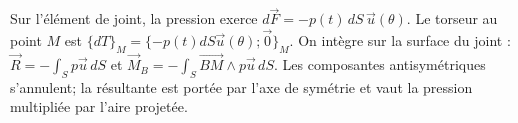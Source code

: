 \begin{corrigebox}
Sur l'élément de joint, la pression exerce
                $d\vec F=-p(t)\,dS\,\vec u(\theta)$. Le torseur au point $M$ est
                $\{dT\}_M=\{-p(t)dS\vec u(\theta);\vec0\}_M$.
On intègre sur la surface du joint :
                $\vec R=-\int_Sp\vec u\,dS$ et
                $\vec M_B=-\int_S\overrightarrow{BM}\wedge p\vec u\,dS$.
                Les composantes antisymétriques s'annulent; la résultante est portée par
                l'axe de symétrie et vaut la pression multipliée par l'aire projetée.
\end{corrigebox}
